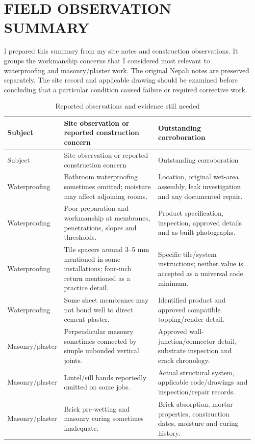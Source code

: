 \chapter{FIELD OBSERVATION SUMMARY}
\label{app:practitioner}
I prepared this summary from my site notes and construction observations. It groups the workmanship concerns that I considered most relevant to waterproofing and masonry/plaster work. The original Nepali notes are preserved separately. The site record and applicable drawing should be examined before concluding that a particular condition caused failure or required corrective work.
\small
\begin{longtable}{@{}L{0.24\textwidth}L{0.30\textwidth}L{0.34\textwidth}@{}}
\caption{Reported observations and evidence still needed}\label{tab:practitionermatrix}\\
\toprule Subject & Site observation or reported construction concern & Outstanding corroboration\\ \midrule\endfirsthead
\toprule Subject & Site observation or reported construction concern & Outstanding corroboration\\ \midrule\endhead
Waterproofing & Bathroom waterproofing sometimes omitted; moisture may affect adjoining rooms. & Location, original wet-area assembly, leak investigation and any documented repair.\\
Waterproofing & Poor preparation and workmanship at membranes, penetrations, slopes and thresholds. & Product specification, inspection, approved details and as-built photographs.\\
Waterproofing & Tile spacers around 3--5 mm mentioned in some installations; four-inch return mentioned as a practice detail. & Specific tile/system instructions; neither value is accepted as a universal code minimum.\\
Waterproofing & Some sheet membranes may not bond well to direct cement plaster. & Identified product and approved compatible topping/render detail.\\
Masonry/plaster & Perpendicular masonry sometimes connected by simple unbonded vertical joints. & Approved wall-junction/connector detail, substrate inspection and crack chronology.\\
Masonry/plaster & Lintel/sill bands reportedly omitted on some jobs. & Actual structural system, applicable code/drawings and inspection/repair records.\\
Masonry/plaster & Brick pre-wetting and masonry curing sometimes inadequate. & Brick absorption, mortar properties, construction dates, moisture and curing history.\\
\bottomrule
\end{longtable}
\normalsize
